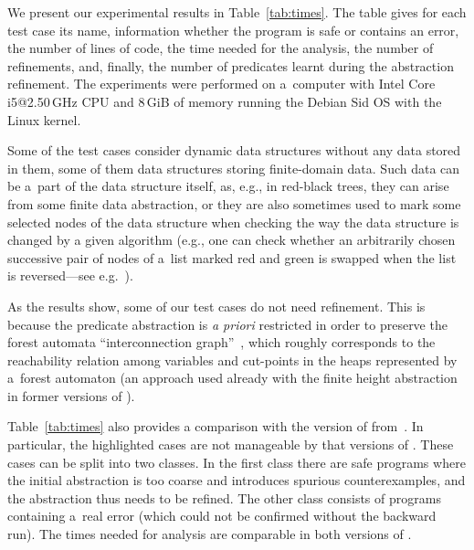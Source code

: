 {We present our experimental results in Table~\ref{tab:times}.
The table gives for each test case its name, information whether the program is safe or
contains an error, the number of lines of code, the time needed for the analysis,
the number of refinements, and, finally, the number of predicates learnt during
the abstraction refinement.
%
 The experiments were
performed on a~computer with Intel Core i5@2.50\,GHz CPU and
8\,GiB of memory running the Debian Sid OS with the Linux kernel.

Some of the test cases consider dynamic data structures without any data stored
in them, some of them data structures storing finite-domain data. Such data can
be a~part of the data structure itself, as, e.g., in red-black trees, they can
arise from some finite data abstraction, or they are also sometimes used to
mark some selected nodes of the data structure when checking the way the data
structure is changed by a given algorithm (e.g., one can check whether an
arbitrarily chosen successive pair of nodes of a~list marked red and green is
swapped when the list is reversed---see e.g.~\cite{artmc}).

As the results show, some of our test cases do not need refinement.
This is because the predicate abstraction is \emph{a priori} restricted in order to preserve the forest automata ``interconnection graph''~\cite{boxes13},
which roughly corresponds to the reachability relation among variables and
cut-points in the heaps represented by a~forest automaton (an approach used
already with the finite height abstraction in former versions of \forester).


Table~\ref{tab:times} also provides a comparison with the version of \forester{} from~\cite{boxes13}.
In particular, the highlighted cases are not manageable by that versions of \forester{}.
These cases can be split into two classes.
In the first class there are safe programs where the initial abstraction is too
coarse and introduces spurious counterexamples, and the abstraction thus needs
to be refined.
The other class consists of programs 
containing a~real error (which could not be confirmed without the backward run).
The times needed for analysis are comparable in both versions of \forester.

}
